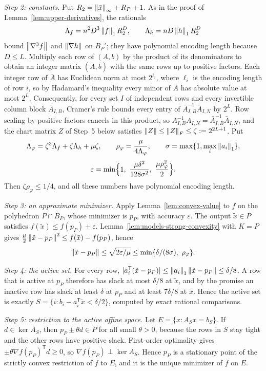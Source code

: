\emph{Step 2: constants.} Put $R_2=\left\lVert\bar x\right\rVert_\infty+R_P+1$. As in the
proof of Lemma~\ref{lem:upper-derivatives}, the rationals
\[
 \Lambda_f=n^2D^3\left\lVert f\right\rVert_1R_2^D,\qquad
 \Lambda_h=nD\left\lVert h\right\rVert_1R_2^D
\]
bound $\left\lVert\nabla^3f\right\rVert$ and $\left\lVert\nabla h\right\rVert$ on $B_P'$; they have
polynomial encoding length because $D\le L$. Multiply each row of $(A,b)$ by
the product of its denominators to obtain an integer matrix $(\bar A,\bar b)$
with the same rows up to positive factors. Each integer row of $\bar A$ has
Euclidean norm at most $2^{\ell_i}$, where $\ell_i$ is the encoding length of
row $i$, so by Hadamard's inequality every minor of $\bar A$ has absolute
value at most $2^L$. Consequently, for every set $I$ of independent rows and
every invertible column block $\bar A_{I,B}$, Cramer's rule bounds every entry
of $\bar A_{I,B}^{-1}\bar A_{I,N}$ by $2^L$. Row scaling by positive factors
cancels in this product, so $A_{I,B}^{-1}A_{I,N}=\bar A_{I,B}^{-1}\bar A_{I,N}$,
and the chart matrix $Z$ of Step~5 below satisfies $\left\lVert Z\right\rVert\le\left\lVert Z\right\rVert_F\le\zeta:=2^{2L+1}$. Put
\[
 \Lambda_\varphi=\zeta^3\Lambda_f+\zeta\Lambda_h+\mu\zeta,\qquad
 \rho_\varphi=\frac{\mu}{4\Lambda_\varphi},\qquad
 \sigma=\max\{1,\max_i\left\lVert a_i\right\rVert_1\},
\]
\[
 \varepsilon=\min\Bigl\{1,\ \frac{\mu\delta^2}{128\sigma^2},\
 \frac{\mu\rho_\varphi^2}{2}\Bigr\}.
\]
Then $\zeta\rho_\varphi\le1/4$, and all these numbers have polynomial
encoding length.

\emph{Step 3: an approximate minimizer.} Apply Lemma~\ref{lem:convex-value}
to $f$ on the polyhedron $P\cap B_P$, whose minimizer is $p_P$, with accuracy
$\varepsilon$. The output $\tilde x\in P$ satisfies
$f(\tilde x)\le f(p_P)+\varepsilon$. Lemma~\ref{lem:models-strong-convexity}
with $K=P$ gives $\frac\mu2\left\lVert\tilde x-p_P\right\rVert^2\le f(\tilde x)-f(p_P)$, hence
\[
 \left\lVert\tilde x-p_P\right\rVert\le\sqrt{2\varepsilon/\mu}
 \le\min\{\delta/(8\sigma),\ \rho_\varphi\}.
\]

\emph{Step 4: the active set.} For every row,
$|a_i^{\mathsf T}(\tilde x-p_P)|\le\left\lVert a_i\right\rVert_1\left\lVert\tilde x-p_P\right\rVert\le\delta/8$.
A row that is active at $p_P$ therefore has slack at most $\delta/8$ at
$\tilde x$, and by the promise an inactive row has slack at least $\delta$ at
$p_P$ and at least $7\delta/8$ at $\tilde x$. Hence the active set is exactly
$S=\{i:b_i-a_i^{\mathsf T}\tilde x<\delta/2\}$, computed by exact rational
comparisons.

\emph{Step 5: restriction to the active affine space.} Let
$E=\{x:A_Sx=b_S\}$. If $d\in\ker A_S$, then $p_P\pm\theta d\in P$ for all
small $\theta>0$, because the rows in $S$ stay tight and the other rows have
positive slack. First-order optimality gives
$\pm\theta\nabla f(p_P)^{\mathsf T}d\ge0$, so $\nabla f(p_P)\perp\ker A_S$. Hence
$p_P$ is a stationary point of the strictly convex restriction of $f$ to $E$,
and it is the unique minimizer of $f$ on $E$.

